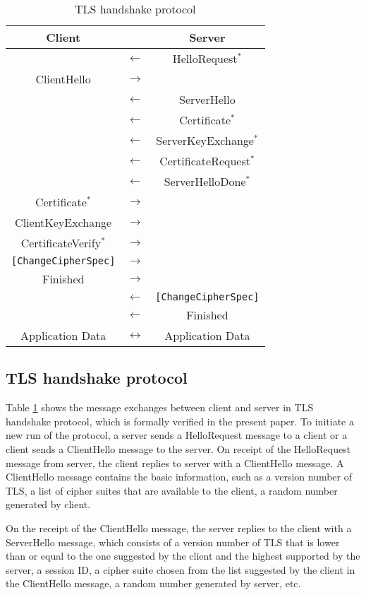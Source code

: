 \documentclass[a4paper,fleqn]{cas-dc}
\begin{document}
\begin{table}[]
\centering
    \begin{tabular}{ c c c }
    Client &  & Server \\ 
    \hline
    & $\leftarrow$ & HelloRequest$^*$ \\  
    ClientHello & $\rightarrow$ & \\ 
    & $\leftarrow$ & ServerHello \\  
    & $\leftarrow$ & Certificate$^*$ \\  
    & $\leftarrow$ & ServerKeyExchange$^*$ \\  
    & $\leftarrow$ & CertificateRequest$^*$ \\  
    & $\leftarrow$ & ServerHelloDone$^*$ \\  
    Certificate$^*$ & $\rightarrow$ & \\ 
    ClientKeyExchange & $\rightarrow$ & \\ 
    CertificateVerify$^*$ & $\rightarrow$ & \\ 
    \verb![ChangeCipherSpec]! & $\rightarrow$ & \\ 
    Finished & $\rightarrow$ & \\ 
    & $\leftarrow$ & \verb![ChangeCipherSpec]! \\  
    & $\leftarrow$ & Finished \\ 
    Application Data & $\leftrightarrow$ & Application Data \\ 
    \end{tabular}
    \caption{TLS handshake protocol}
    \label{tab:tb1}
\end{table}

\subsection{TLS handshake protocol}\label{handshake}
Table \ref{tab:tb1} shows the message exchanges between client and server in TLS handshake protocol, which is formally verified in the present paper. To initiate a new run of the protocol, a server sends a HelloRequest message to a client or a client sends a ClientHello message to the server. On receipt of the HelloRequest message from server, the client replies to server with a ClientHello message. A ClientHello message contains the basic information, such as a version number of TLS, a list of cipher suites that are available to the client, a random number generated by client.

On the receipt of the ClientHello message, the server replies to the client with a ServerHello message, which consists of a version number of TLS that is lower than or equal to the one suggested by the client and the highest supported by the server, a session ID, a cipher suite chosen from the list suggested by the client in the ClientHello message, a random number generated by server, etc. 
\end{document}
